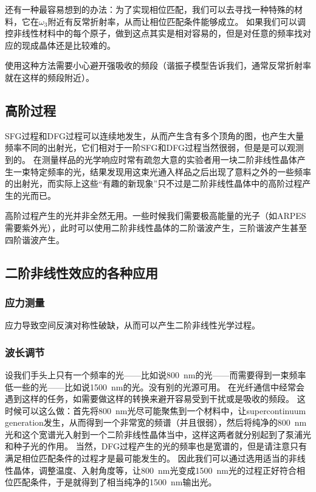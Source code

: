 还有一种最容易想到的办法：为了实现相位匹配，我们可以去寻找一种特殊的材料，它在$\omega_3$附近有反常折射率，从而让相位匹配条件能够成立。
如果我们可以调控非线性材料中的每个原子，做到这点其实是相对容易的，但是对任意的频率找对应的现成晶体还是比较难的。

使用这种方法需要小心避开强吸收的频段（谐振子模型告诉我们，通常反常折射率就在这样的频段附近）。

\subsection{高阶过程}

SFG过程和DFG过程可以连续地发生，从而产生含有多个顶角的图，也产生大量频率不同的出射光，它们相对于一阶SFG和DFG过程当然很弱，但是是可以观测到的。
在测量样品的光学响应时常有疏忽大意的实验者用一块二阶非线性晶体产生一束特定频率的光，结果发现用这束光通入样品之后出现了意料之外的一些频率的出射光，而实际上这些“有趣的新现象”只不过是二阶非线性晶体中的高阶过程产生的光而已。

高阶过程产生的光并非全然无用。一些时候我们需要极高能量的光子（如ARPES需要紫外光），此时可以使用二阶非线性晶体的二阶谐波产生，三阶谐波产生甚至四阶谐波产生。

\subsection{二阶非线性效应的各种应用}

\subsubsection{应力测量}

应力导致空间反演对称性破缺，从而可以产生二阶非线性光学过程。

\subsubsection{波长调节}

设我们手头上只有一个频率的光——比如说\SI{800}{nm}的光——而需要得到一束频率低一些的光——比如说\SI{1500}{nm}的光。没有别的光源可用。
在光纤通信中经常会遇到这样的任务，如需要做这样的转换来避开容易受到干扰或是吸收的频段。
这时候可以这么做：首先将\SI{800}{nm}光尽可能聚焦到一个材料中，让supercontinuum generation发生，从而得到一个非常宽的频谱（并且很弱），然后将纯净的\SI{800}{nm}光和这个宽谱光入射到一个二阶非线性晶体当中，这样这两者就分别起到了泵浦光和种子光的作用。
当然，DFG过程产生的光的频率也是宽谱的，但是请注意只有满足相位匹配条件的过程才是最可能发生的。
因此我们可以通过选用适当的非线性晶体，调整温度、入射角度等，让\SI{800}{nm}光变成\SI{1500}{nm}光的过程正好符合相位匹配条件，于是就得到了相当纯净的\SI{1500}{nm}输出光。

